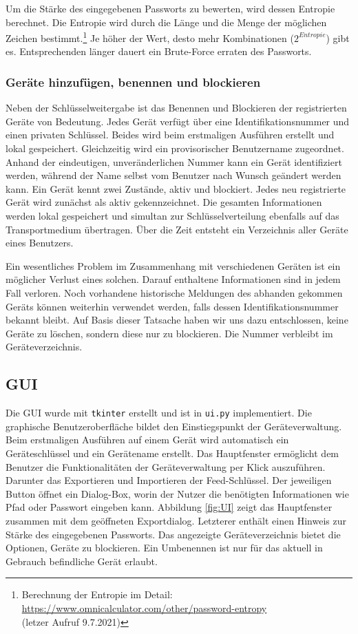 \documentclass[a4paper,titlepage]{article}
\newcommand{\ilc}[1]{\textcolor{codeColor}{\texttt{#1}}}
\begin{document}
Um die Stärke des eingegebenen Passworts zu bewerten, wird dessen Entropie berechnet. Die Entropie wird durch die Länge und die Menge der möglichen Zeichen bestimmt.\footnote{Berechnung der Entropie im Detail: \\ \url{https://www.omnicalculator.com/other/password-entropy} \\ (letzer Aufruf 9.7.2021)} Je höher der Wert, desto mehr Kombinationen ($2^{Entropie}$) gibt es. Entsprechenden länger dauert ein Brute-Force erraten des Passworts.

\subsubsection*{Geräte hinzufügen, benennen und blockieren}
Neben der Schlüsselweitergabe ist das Benennen und Blockieren der registrierten Geräte von Bedeutung. Jedes Gerät verfügt über eine Identifikationsnummer und einen privaten Schlüssel. Beides wird beim erstmaligen Ausführen erstellt und lokal gespeichert. Gleichzeitig wird ein provisorischer Benutzername zugeordnet. Anhand der eindeutigen, unveränderlichen Nummer kann ein Gerät identifiziert werden, während der Name selbst vom Benutzer nach Wunsch geändert werden kann. Ein Gerät kennt zwei Zustände, aktiv und blockiert. Jedes neu registrierte Gerät wird zunächst als aktiv gekennzeichnet. Die gesamten Informationen werden lokal gespeichert und simultan zur Schlüsselverteilung ebenfalls auf das Transportmedium übertragen. Über die Zeit entsteht ein Verzeichnis aller Geräte eines Benutzers.

Ein wesentliches Problem im Zusammenhang mit verschiedenen Geräten ist ein möglicher Verlust eines solchen. Darauf enthaltene Informationen sind in jedem Fall verloren. Noch vorhandene historische Meldungen des abhanden gekommen Geräts können weiterhin verwendet werden, falls dessen Identifikationsnummer bekannt bleibt. Auf Basis dieser Tatsache haben wir uns dazu entschlossen, keine Geräte zu löschen, sondern diese nur zu blockieren. Die Nummer verbleibt im Geräteverzeichnis.

\subsection{GUI}
Die GUI wurde mit \ilc{tkinter} erstellt und ist in \ilc{ui.py} implementiert. Die graphische Benutzeroberfläche bildet den Einstiegspunkt der Geräteverwaltung. Beim erstmaligen Ausführen auf einem Gerät wird automatisch ein Geräteschlüssel und ein Gerätename erstellt. Das Hauptfenster ermöglicht dem Benutzer die Funktionalitäten der Geräteverwaltung per Klick auszuführen. Darunter das Exportieren und Importieren der Feed-Schlüssel. Der jeweiligen Button öffnet ein Dialog-Box, worin der Nutzer die benötigten Informationen wie Pfad oder Passwort eingeben kann. Abbildung \ref{fig:UI} zeigt das Hauptfenster zusammen mit dem geöffneten Exportdialog. Letzterer enthält einen Hinweis zur Stärke des eingegebenen Passworts. Das angezeigte Geräteverzeichnis bietet die Optionen, Geräte zu blockieren. Ein Umbenennen ist nur für das aktuell in Gebrauch befindliche Gerät erlaubt.
\end{document}
